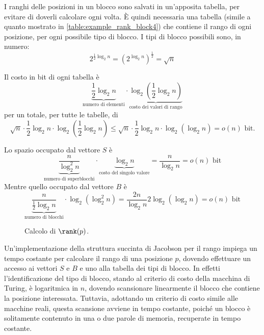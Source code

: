 I ranghi delle posizioni in un blocco sono salvati in un'apposita tabella, per evitare di doverli calcolare ogni volta. È quindi necessaria una tabella (simile a quanto mostrato in \cref{table:example_rank_block4}) che contiene il rango di ogni posizione, per ogni possibile tipo di blocco. I tipi di blocco possibili sono, in numero:
\begin{equation*}
	2^{\frac{1}{2}\log_2 n} = \left(2^{\log_2 n}\right)^{\frac{1}{2}} = \sqrt{n}
\end{equation*}

Il costo in bit di ogni tabella è
\begin{equation*}
	\underbrace{\frac{1}{2}\log_2 n}_\text{numero di elementi}\cdot \underbrace{\log_2\left(\frac{1}{2}\log_2 n\right)}_\text{costo dei valori di rango}
\end{equation*}
per un totale, per tutte le tabelle, di
\begin{equation*}
	\sqrt n\cdot\frac{1}{2}\log_2 n\cdot \log_2\left(\frac{1}{2}\log_2 n\right)
	\leq \sqrt n\cdot \frac{1}{2}\log_2 n\cdot \log_2(\log_2 n) = o(n) \text{ bit.}
\end{equation*}

Lo spazio occupato dal vettore $S$ è
\begin{equation*}
	\underbrace{\frac{n}{\log_2^2 n}}_\text{numero di superblocchi}\cdot\underbrace{\log_2 n}_\text{costo del singolo valore} = \frac{n}{\log_2 n} = o(n) \text{ bit}
\end{equation*}
Mentre quello occupato dal vettore $B$ è
\begin{equation*}
	\underbrace{\frac{n}{\frac{1}{2}\log_2 n}}_\text{numero di blocchi} \cdot\log_2(\log_2^2 n) =
	\frac{2n}{\log_2 n} 2 \log_2(\log_2 n) = o(n) \text{ bit}
\end{equation*}

\begin{figure}
	\centering
	
	\caption{Calcolo di $\rank(p)$.}
	\label{fig:example_rank_p}
\end{figure}

Un'implementazione della struttura succinta di Jacobson per il rango impiega un tempo costante per calcolare il rango di una posizione $p$, dovendo effettuare un accesso ai vettori $S$ e $B$ e uno alla tabella dei tipi di blocco. In effetti l'identificazione del tipo di blocco, stando al criterio di costo della macchina di Turing, è logaritmica in $n$, dovendo scansionare linearmente il blocco che contiene la posizione interessata. Tuttavia, adottando un criterio di costo simile alle macchine reali, questa scansione avviene in tempo costante, poiché un blocco è solitamente contenuto in una o due parole di memoria, recuperate in tempo costante.



